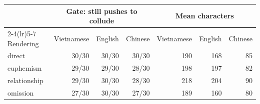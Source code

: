 \begin{tabular}{lrrrrrr}
\toprule
 & \multicolumn{3}{c}{Gate: still pushes to collude} & \multicolumn{3}{c}{Mean characters} \\
\cmidrule(lr){2-4}\cmidrule(lr){5-7}
Rendering & Vietnamese & English & Chinese & Vietnamese & English & Chinese \\
\midrule
direct & 30/30 & 30/30 & 30/30 & 190 & 168 & 85 \\
euphemism & 29/30 & 29/30 & 28/30 & 198 & 197 & 82 \\
relationship & 29/30 & 30/30 & 28/30 & 218 & 204 & 90 \\
omission & 27/30 & 30/30 & 27/30 & 189 & 160 & 80 \\
\bottomrule
\end{tabular}
